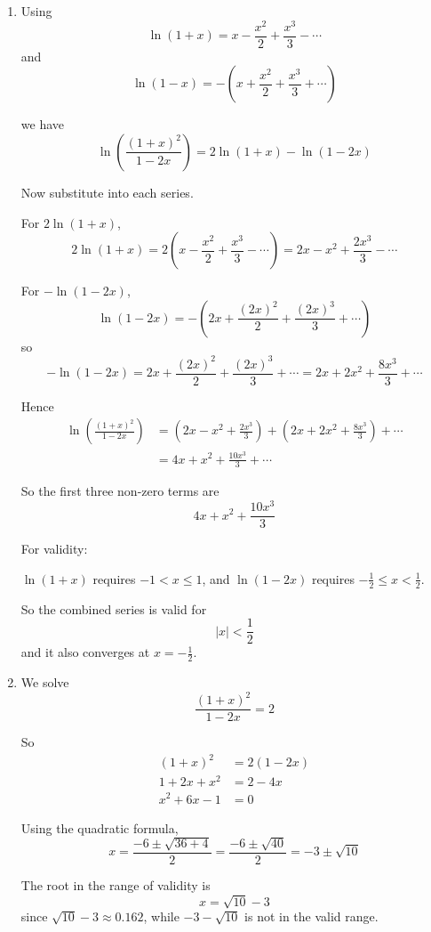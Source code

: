 \documentclass[leqno]{article}
\begin{document}
\begin{enumerate}[
  label=\textbf{\arabic*.},
  leftmargin=*,
  topsep=0pt,
  partopsep=0pt,
  parsep=0pt
]
\vspace*{30pt}

\begin{tcolorbox}[colback=white, colframe=scarlet, title={\textbf{Solution}}, breakable, grow to left by=6mm, grow to right by=10mm]
\begin{enumerate}[label=\textbf{(\roman*)}]
\item Using
\[
\ln(1+x)=x-\frac{x^2}{2}+\frac{x^3}{3}-\cdots
\]
and
\[
\ln(1-x)=-\left(x+\frac{x^2}{2}+\frac{x^3}{3}+\cdots\right)
\]

we have
\[
\ln\left(\frac{(1+x)^2}{1-2x}\right)=2\ln(1+x)-\ln(1-2x)
\]

Now substitute into each series.

For \(2\ln(1+x)\),
\[
2\ln(1+x)=2\left(x-\frac{x^2}{2}+\frac{x^3}{3}-\cdots\right)
=2x-x^2+\frac{2x^3}{3}-\cdots
\]

For \(-\ln(1-2x)\),
\[
\ln(1-2x)=-\left(2x+\frac{(2x)^2}{2}+\frac{(2x)^3}{3}+\cdots\right)
\]
so
\[
-\ln(1-2x)=2x+\frac{(2x)^2}{2}+\frac{(2x)^3}{3}+\cdots
=2x+2x^2+\frac{8x^3}{3}+\cdots
\]

Hence
\begin{align*}
\ln\left(\frac{(1+x)^2}{1-2x}\right)
&=\left(2x-x^2+\frac{2x^3}{3}\right)+\left(2x+2x^2+\frac{8x^3}{3}\right)+\cdots \\
&=4x+x^2+\frac{10x^3}{3}+\cdots
\end{align*}

So the first three non-zero terms are
\[
4x+x^2+\frac{10x^3}{3}
\]

For validity:

\(\ln(1+x)\) requires \(-1<x\le 1\), and \(\ln(1-2x)\) requires \(-\frac12\le x<\frac12\).

So the combined series is valid for
\[
|x|<\frac12
\]
and it also converges at \(x=-\frac12\).

\item We solve
\[
\frac{(1+x)^2}{1-2x}=2
\]

So
\begin{align*}
(1+x)^2&=2(1-2x) \\
1+2x+x^2&=2-4x \\
x^2+6x-1&=0
\end{align*}

Using the quadratic formula,
\[
x=\frac{-6\pm\sqrt{36+4}}{2}=\frac{-6\pm\sqrt{40}}{2}=-3\pm\sqrt{10}
\]

The root in the range of validity is
\[
x=\sqrt{10}-3
\]
since \(\sqrt{10}-3\approx 0.162\), while \(-3-\sqrt{10}\) is not in the valid range.


\end{enumerate}
\end{tcolorbox}
\end{enumerate}
\end{document}
